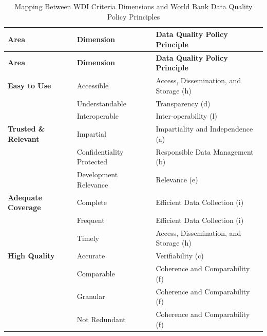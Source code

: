 \documentclass[
  11pt,
  a4paper,
  DIV=11,
  numbers=noendperiod]{scrreprt}
\begin{document}
\begin{longtable}[]{@{}
  >{\raggedright\arraybackslash}p{}
  >{\raggedright\arraybackslash}p{}
  >{\raggedright\arraybackslash}p{}@{}}
\caption{Mapping Between WDI Criteria Dimensions and World Bank Data
Quality Policy Principles}\label{tbl-a_3}\tabularnewline
\toprule\noalign{}
\begin{minipage}[b]{\linewidth}\raggedright
\textbf{Area}
\end{minipage} & \begin{minipage}[b]{\linewidth}\raggedright
\textbf{Dimension}
\end{minipage} & \begin{minipage}[b]{\linewidth}\raggedright
\textbf{Data Quality Policy Principle}
\end{minipage} \\
\midrule\noalign{}
\endfirsthead
\toprule\noalign{}
\begin{minipage}[b]{\linewidth}\raggedright
\textbf{Area}
\end{minipage} & \begin{minipage}[b]{\linewidth}\raggedright
\textbf{Dimension}
\end{minipage} & \begin{minipage}[b]{\linewidth}\raggedright
\textbf{Data Quality Policy Principle}
\end{minipage} \\
\midrule\noalign{}
\endhead
\bottomrule\noalign{}
\endlastfoot
\textbf{Easy to Use} & Accessible & Access, Dissemination, and Storage
(h) \\
& Understandable & Transparency (d) \\
& Interoperable & Inter-operability (l) \\
\textbf{Trusted \& Relevant} & Impartial & Impartiality and Independence
(a) \\
& Confidentiality Protected & Responsible Data Management (b) \\
& Development Relevance & Relevance (e) \\
\textbf{Adequate Coverage} & Complete & Efficient Data Collection (i) \\
& Frequent & Efficient Data Collection (i) \\
& Timely & Access, Dissemination, and Storage (h) \\
\textbf{High Quality} & Accurate & Verifiability (c) \\
& Comparable & Coherence and Comparability (f) \\
& Granular & Coherence and Comparability (f) \\
& Not Redundant & Coherence and Comparability (f) \\
\end{longtable}
\end{document}
